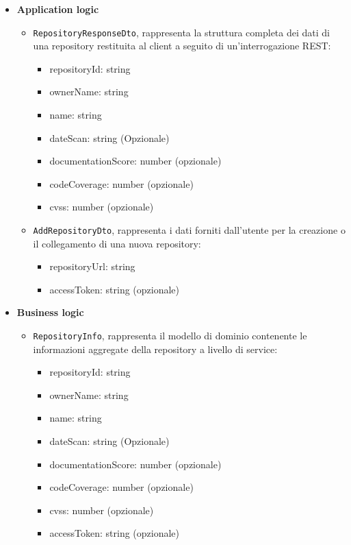 \documentclass[a4paper, 11pt]{article}
\newcounter{subsubsubsection}[subsubsection]
\newcounter{subsubsubsubsection}[subsubsubsection]
\begin{document}
\begin{itemize}
  \item \textbf{Application logic}
    \begin{itemize}
      \item \texttt{RepositoryResponseDto}, rappresenta la struttura completa dei dati di una repository restituita al client a seguito di un'interrogazione REST:
      \begin{itemize}
          \item repositoryId: string 
          \item ownerName: string 
          \item name: string 
          \item dateScan: string (Opzionale)
          \item documentationScore: number (opzionale)
          \item codeCoverage: number (opzionale)
          \item cvss: number (opzionale)
      \end{itemize}

      \item \texttt{AddRepositoryDto}, rappresenta i dati forniti dall'utente per la creazione o il collegamento di una nuova repository:
      \begin{itemize}
          \item repositoryUrl: string
          \item accessToken: string (opzionale)
      \end{itemize}
    \end{itemize}

  \item \textbf{Business logic}
    \begin{itemize}
      \item \texttt{RepositoryInfo}, rappresenta il modello di dominio contenente le informazioni aggregate della repository a livello di service:
      \begin{itemize}
          \item repositoryId: string 
          \item ownerName: string 
          \item name: string 
          \item dateScan: string (Opzionale)
          \item documentationScore: number (opzionale)
          \item codeCoverage: number (opzionale)
          \item cvss: number (opzionale)
          \item accessToken: string (opzionale)
      \end{itemize}


\end{itemize}
\end{itemize}
\end{document}
